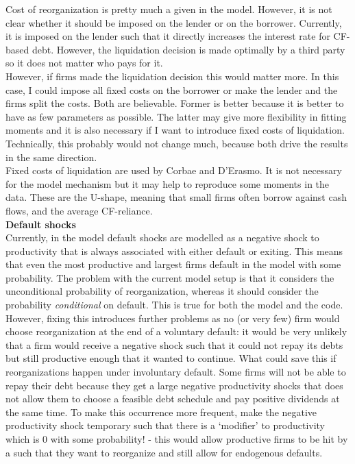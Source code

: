 \documentclass[12pt]{article}
\begin{document}
Cost of reorganization is pretty much a given in the model. However, it is not clear whether it should be imposed on the lender or on the borrower. Currently, it is imposed on the lender such that it directly increases the interest rate for CF-based debt. However, the liquidation decision is made optimally by a third party so it does not matter who pays for it.  \vspace{3mm} \\
However, if firms made the liquidation decision this would matter more. In this case, I could impose all fixed costs on the borrower or make the lender and the firms split the costs. Both are believable. Former is better because it is better to have as few parameters as possible. The latter may give more flexibility in fitting moments and it is also necessary if I want to introduce fixed costs of liquidation. Technically, this probably would not change much, because both drive the results in the same direction. 
\vspace{3mm} \\
Fixed costs of liquidation are used by Corbae and D'Erasmo. It is not necessary for the model mechanism but it may help to reproduce some moments in the data. These are the U-shape, meaning that small firms often borrow against cash flows, and the average CF-reliance. \vspace{3mm} \\
\textbf{Default shocks} \\
Currently, in the model default shocks are modelled as a negative shock to productivity that is always associated with either default or exiting. This means that even the most productive and largest firms default in the model with some probability. The problem with the current model setup is that it considers the unconditional probability of reorganization, whereas it should consider the probability \textit{conditional} on default. This is true for both the model and the code.   \vspace{3mm} \\
However, fixing this introduces further problems as no (or very few) firm would choose reorganization at the end of a voluntary default: it would be very unlikely that a firm would receive a negative shock such that it could not repay its debts but still productive enough that it wanted to continue. What could save this if reorganizations happen under involuntary default. Some firms will not be able to repay their debt because they get a large negative productivity shocks that does not allow them to choose a feasible debt schedule and pay positive dividends at the same time. To make this occurrence more frequent, make the negative productivity shock temporary such that there is a `modifier' to productivity which is 0 with some probability! - this would allow productive firms to be hit by a such that they want to reorganize and still allow for endogenous defaults. \vspace{3mm} \\
\end{document}
